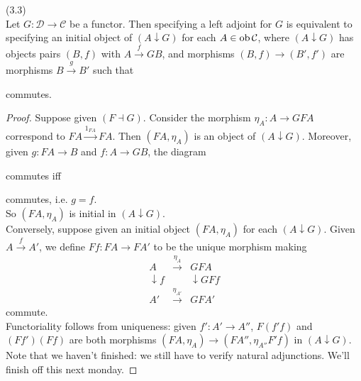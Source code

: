 \documentclass[a4paper]{article}
\begin{document}
\begin{thm} (3.3)\\
    Let $G:\mathcal{D} \to \mathcal{C}$ be a functor. Then specifying a left adjoint for $G$ is equivalent to specifying an initial object of $(A \downarrow G)$ for each $A \in \operatorname{ob} \mathcal{C}$, where $(A \downarrow G)$ has objects pairs $(B,f)$ with $A \xrightarrow{f} GB$, and morphisms $(B,f) \to (B',f')$ are morphisms $B \xrightarrow{g} B'$ such that 


    commutes.
    \begin{proof}
        Suppose given $(F \dashv G)$. Consider the morphism $\eta_A:A \to GFA$ correspond to $FA \xrightarrow{1_{FA}} FA$. Then $(FA,\eta_A)$ is an object of $(A \downarrow G)$. Moreover, given $g:FA \to B$ and $f:A \to GB$, the diagram 


        commutes iff


        commutes, i.e. $g=\hat{f}$.\\
        So $(FA,\eta_A)$ is initial in $(A \downarrow G)$.\\
        Conversely, suppose given an initial object $(FA,\eta_A)$ for each $(A \downarrow G)$. Given $A \xrightarrow{f} A'$, we define $Ff : FA \to FA'$ to be the unique morphism making 
        \begin{equation*}
            \begin{aligned}
                A & \xrightarrow{\eta_A} & GFA\\
                \downarrow f & & \downarrow GFf\\
                A' & \xrightarrow{\eta_{A'}} & GFA'
            \end{aligned}
        \end{equation*}
        commute.\\
        Functoriality follows from uniqueness: given $f': A' \to A''$, $F(f'f)$ and $(Ff')(Ff)$ are both morphisms $(FA,\eta_A) \to (FA'',\eta_{A''}F'f)$ in $(A \downarrow G)$.\\
        Note that we haven't finished: we still have to verify natural adjunctions. We'll finish off this next monday. 


\end{proof}
\end{thm}
\end{document}
